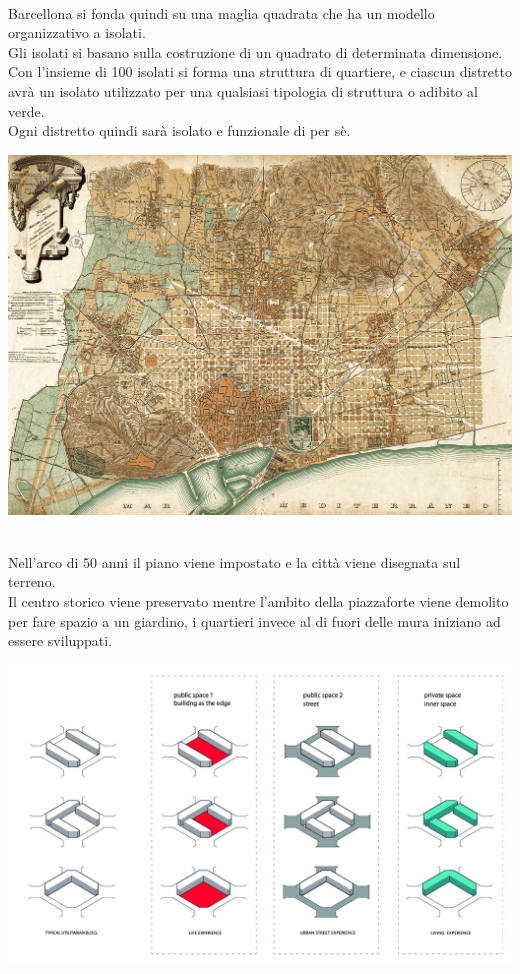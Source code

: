 \documentclass[a4paper,12pt, oneside]{book}
\begin{document}
    \leavevmode\\
    Barcellona si fonda quindi su una maglia quadrata che ha un modello organizzativo a isolati.\\
    Gli isolati si basano sulla costruzione di un quadrato di determinata dimensione. Con l'insieme di 100 isolati si forma una struttura di quartiere, e ciascun distretto avrà un isolato utilizzato per una qualsiasi tipologia di struttura o adibito al verde.\\
    Ogni distretto quindi sarà isolato e funzionale di per sè.\\
    \begin{center}
    	\includegraphics[width=0.6\linewidth]{"immagini/Barcelona-map-1890"}
    	\label{fig:barcelona-map-1890}
    \end{center}
    \leavevmode\\
    Nell'arco di 50 anni il piano viene impostato e la città viene disegnata sul terreno.\\
    Il centro storico viene preservato mentre l'ambito della piazzaforte viene demolito per fare spazio a un giardino, i quartieri invece al di fuori delle mura iniziano ad essere sviluppati.\\
    \begin{center}
    	\includegraphics[width=0.6\linewidth]{"immagini/barcelona space components"}
    	\label{fig:barcelona space components}
    \end{center}
\end{document}
